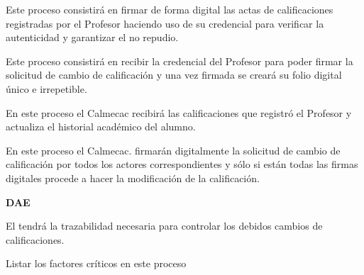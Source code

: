 \begin{PDescripcion}
\begin{enumerate}
        \Ppaso[\PSubProceso] Este proceso consistirá en firmar de forma digital las actas de calificaciones registradas por el Profesor haciendo uso de su credencial para verificar la autenticidad y garantizar el no repudio.
        
        \Ppaso[\PSubProceso] Este proceso consistirá en recibir la credencial del Profesor para poder firmar la solicitud de cambio de calificación y una vez firmada se creará su folio digital único e irrepetible.
        
        \Ppaso[\PSubProceso] En este proceso el Calmecac recibirá las calificaciones que registró el Profesor y actualiza el historial académico del alumno.
        
        \Ppaso[\PSubProceso] En este proceso el Calmecac. firmarán digitalmente la solicitud de cambio de calificación por todos los actores correspondientes y sólo si están todas las firmas digitales procede a hacer la modificación de la calificación.
        
    \end{enumerate}
    
    \Ppaso \textbf{DAE}
    \begin{enumerate}
        
        \Ppaso[\PSubProceso] El  tendrá la trazabilidad necesaria para controlar los debidos cambios de calificaciones.
    
    
    \end{enumerate}
\end{PDescripcion}


\begin{FCDescripcion}
    \FCpaso Listar los factores críticos en este proceso
\end{FCDescripcion}










